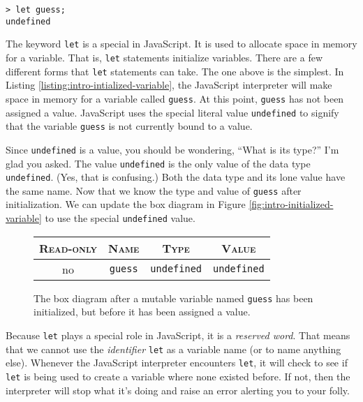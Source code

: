 \begin{lstlisting}[caption={\label{listing:intro-initialized-variable} The NodeJS syntax to create a mutable variable named \texttt{guess}. The result is a value whose box diagram is \ref{fig:intro-initialized-variable}.}]
> let guess;
undefined
\end{lstlisting}

The keyword \texttt{let} is a special in JavaScript. It is used to allocate space in memory for a variable. That is, \texttt{let} statements initialize variables. There are a few different forms that \texttt{let} statements can take. The one above is the simplest. In Listing \ref{listing:intro-intialized-variable}, the JavaScript interpreter will make space in memory for a variable called \texttt{guess}. At this point, \texttt{guess} has not been assigned a value. JavaScript uses the special literal value \texttt{undefined} to signify that the variable \texttt{guess} is not currently bound to a value.

Since \texttt{undefined} is a value, you should be wondering, ``What is its type?'' I'm glad you asked. The value \texttt{undefined} is the only value of the data type \texttt{undefined}. (Yes, that is confusing.) Both the data type and its lone value have the same name. Now that we know the type and value of \texttt{guess} after initialization. We can update the box diagram in Figure \ref{fig:intro-initialized-variable} to use the special \texttt{undefined} value.

\begin{figure}[h]
  \begin{tabular}{|c|c|c|c|}
    \hline
    \textsc{Read-only} & \textsc{Name} & \textsc{Type} & \textsc{Value}\\
    \hline
    no & \texttt{guess} & \texttt{undefined} & \texttt{undefined}\\
    \hline
  \end{tabular}
  \caption{\label{fig:intro-undefined-variable} The box diagram after a mutable variable named \texttt{guess} has been initialized, but before it has been assigned a value.}
\end{figure}

Because \texttt{let} plays a special role in JavaScript, it is a \emph{reserved word}. That means that we cannot use the \emph{identifier} \texttt{let} as a variable name (or to name anything else).  Whenever the JavaScript interpreter encounters \texttt{let}, it will check to see if \texttt{let} is being used to create a variable where none existed before. If not, then the interpreter will stop what it's doing and raise an error alerting you to your folly.

